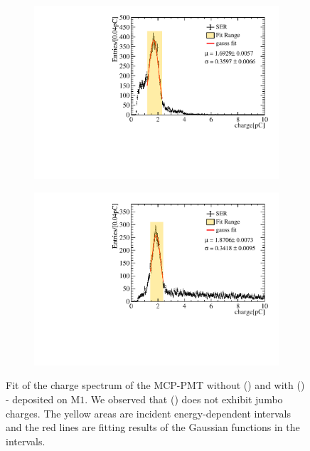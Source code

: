 \begin{figure}[!ht]
	\centering
	\begin{subfigure}[b]{0.48\textwidth}
		\centering
		\includegraphics[width=\textwidth]{PMTRelated/GTmodel/fit_noald.pdf}
		\caption{}
		\label{fig:gain_noald}
	\end{subfigure}
	\hfill
	\begin{subfigure}[b]{0.48\textwidth}
		\centering
		\includegraphics[width=\textwidth]{PMTRelated/GTmodel/fit_ald.pdf}
		\caption{}
		\label{fig:gain_ald}
	\end{subfigure}

	\caption{Fit of the charge spectrum of the MCP-PMT without () and with ()
		- deposited on $\mathrm{M}1$.
		We observed that () does not exhibit jumbo charges.
		The yellow areas are incident energy-dependent intervals and
		the red lines are fitting results of the Gaussian functions in the intervals.
	}
	\label{fig:gain_fit}
\end{figure}

